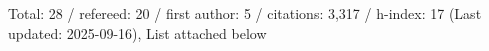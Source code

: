 Total: 28 / refereed: 20 / first author: 5 / citations: 3,317 / h-index: 17 (Last updated: 2025-09-16), List attached below